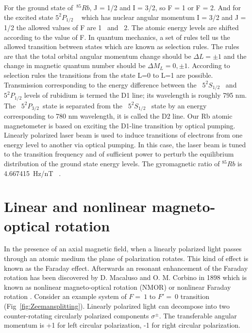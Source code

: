 For the ground state of~$^{85}{Rb}$, J = 1/2 and I = 3/2, so F = 1 or F = 2. And  for the excited state $5^2P_{1/2}$ ~  which has nuclear angular momentum I = 3/2 and J = 1/2  the allowed values of F are  1 ~and~ 2. The atomic energy levels are shifted according to the value of F. In quantum mechanics, a set of rules tell us the allowed transition between states which are known as selection rules. The rules are that the total orbital angular momentum change should be $\Delta L= \pm 1$ and the change in magnetic quantum number should be $\Delta M_L= 0,\pm 1$. According to selection rules the transitions from the state L=0 to L=1 are possible. Transmission corresponding to the energy difference between the ~$5^2S_{1/2}$~ and~ $5^2P_{1/2}$ levels of rubidium is termed the D1 line; its wavelength is roughly 795 nm\cite{doe:website}.  The ~$5^2P_{3/2}$~state is separated from the ~$5^2S_{1/2}$~ state by an energy corresponding to 780 nm wavelength, it is called the D2 line. Our Rb atomic magnetometer is based on exciting the D1-line transition by optical pumping.  Linearly polarized laser beam is used to induce transitions of electrons from one energy level to another via optical pumping. In this case, the laser beam is tuned to the transition frequency and of sufficient power to perturb the equilibrium distribution of the ground state energy levels. The gyromagnetic ratio of  $^{85}Rb$ is 4.667415~Hz/nT~ \cite{bib:gyro}.
\section{Linear and nonlinear magneto-optical rotation }
In the presence of an axial magnetic field, when a linearly polarized light passes through an atomic medium the plane of polarization rotates. This kind of effect is known as the Faraday effect. Afterwards an resonant enhancement of the Faraday rotation has been discovered by D. Macaluso and O. M. Corbino in 1898 which is known as nonlinear magneto-optical rotation (NMOR) or nonlinear Faraday rotation \cite{budker2013optical}. Consider an example system of $ F=~1$ to $F'=~0$ transition (Fig~\ref{fig:Zeemansplitting}).  Linearly polarized light can decompose into two counter-rotating circularly polarized components $\sigma^\pm$. The transferable angular momentum is +1 for left circular polarization, -1 for right circular polarization. 
 
